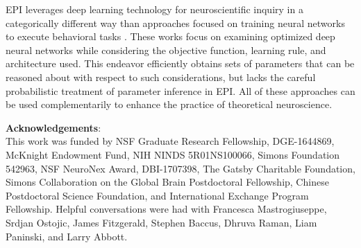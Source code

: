 \documentclass[11pt]{article}
\begin{document}


EPI leverages deep learning technology for neuroscientific inquiry in a categorically different way than approaches focused on training neural networks to execute behavioral tasks \cite{richards2019deep}. 
These works focus on examining optimized deep neural networks while considering the objective function, learning rule, and architecture used.
This endeavor efficiently obtains sets of parameters that can be reasoned about with respect to such considerations, but lacks the careful probabilistic treatment of parameter inference in EPI.
All of these approaches can be used complementarily to enhance the practice of theoretical neuroscience.


\textbf{Acknowledgements}: \\
This work was funded by NSF Graduate Research Fellowship,  DGE-1644869, McKnight Endowment Fund, NIH NINDS 5R01NS100066, Simons Foundation 542963, NSF NeuroNex Award, DBI-1707398, The Gatsby Charitable Foundation, Simons Collaboration on the Global Brain Postdoctoral Fellowship, Chinese Postdoctoral Science Foundation, and International Exchange Program Fellowship. 
Helpful conversations were had with Francesca Mastrogiuseppe, Srdjan Ostojic, James Fitzgerald, Stephen Baccus, Dhruva Raman, Liam Paninski, and Larry Abbott.
\end{document}
